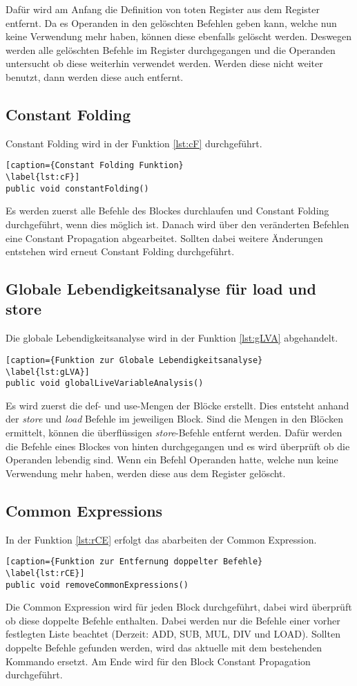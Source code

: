 \documentclass[a4paper]{article}
\begin{document}
Dafür wird am Anfang die Definition von toten Register aus dem Register entfernt.
Da es Operanden in den gelöschten Befehlen geben kann, welche nun keine Verwendung mehr haben, können diese ebenfalls gelöscht werden.
Deswegen werden alle gelöschten Befehle im Register durchgegangen und die Operanden untersucht ob diese weiterhin verwendet werden.
Werden diese nicht weiter benutzt, dann werden diese auch entfernt.

\subsection{Constant Folding}
Constant Folding wird in der Funktion \ref{lst:cF} durchgeführt.

\begin{lstlisting}[caption={Constant Folding Funktion}
\label{lst:cF}]
public void constantFolding()
\end{lstlisting}
Es werden zuerst alle Befehle des Blockes durchlaufen und Constant Folding durchgeführt, wenn dies möglich ist.
Danach wird über den veränderten Befehlen eine Constant Propagation abgearbeitet. 
Sollten dabei weitere Änderungen entstehen wird erneut Constant Folding durchgeführt.


\subsection{Globale Lebendigkeitsanalyse für load und store}
Die globale Lebendigkeitsanalyse wird in der Funktion \ref{lst:gLVA} abgehandelt.
\begin{lstlisting}[caption={Funktion zur Globale Lebendigkeitsanalyse}
\label{lst:gLVA}]
public void globalLiveVariableAnalysis()
\end{lstlisting}
Es wird zuerst die def- und use-Mengen der Blöcke erstellt.
Dies entsteht anhand der \textit{store} und \textit{load} Befehle im jeweiligen Block.
Sind die Mengen in den Blöcken ermittelt, können die überflüssigen \textit{store}-Befehle entfernt werden.
Dafür werden die Befehle eines Blockes von hinten durchgegangen und es wird überprüft ob die Operanden lebendig sind.
Wenn ein Befehl Operanden hatte, welche nun keine Verwendung mehr haben, werden diese aus dem Register gelöscht.

\subsection{Common Expressions}
In der Funktion \ref{lst:rCE} erfolgt das abarbeiten der Common Expression.
\begin{lstlisting}[caption={Funktion zur Entfernung doppelter Befehle}
\label{lst:rCE}]
public void removeCommonExpressions()
\end{lstlisting}
Die Common Expression wird für jeden Block durchgeführt, dabei wird überprüft ob diese doppelte Befehle enthalten. 
Dabei werden nur die Befehle einer vorher festlegten Liste beachtet (Derzeit: ADD, SUB, MUL, DIV und LOAD).
Sollten doppelte Befehle gefunden werden, wird das aktuelle mit dem bestehenden Kommando ersetzt.
Am Ende wird für den Block Constant Propagation durchgeführt.
\end{document}
